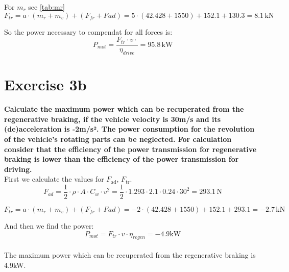 \documentclass[final]{scrreprt} %
\begin{document}
For $m_r$ see \ref{tab:mr}
\begin{equation}
F_{tr} = a\cdot(m_{r} + m_{v}) + (F_{fr} + F{ad}) = 5\cdot(42.428 + 1550) + 152.1 + 130.3 = 8.1\, \mathrm{kN}
\end{equation}

So the power necessary to compendat for all forces is:
\begin{equation}
P_{mot} = \frac{F_{tr} \cdot v \cdot}{ \eta_{drive}} = 95.8 \, \mathrm{kW}
\end{equation}

\section{Exercise 3b}
{\bf Calculate the maximum power which can be recuperated from the regenerative braking, if the vehicle velocity is 30m/s and its (de)acceleration is -2m/s². The power consumption for the revolution of the vehicle's rotating parts can be neglected. For calculation consider that the efficiency of the power transmission for regenerative braking is lower than the efficiency of the power transmission for driving.}\\

First we calculate the values for  $F_{\mathrm{ad}}$, $F_{\mathrm{tr}}$.\\
\begin{equation}
F_{ad} = \frac{1}{2} \cdot \rho \cdot A \cdot C_{w} \cdot v^2 = \frac{1}{2} \cdot 1.293 \cdot 2.1  \cdot 0.24 \cdot 30^2 = 293.1 \, \mathrm{N}
\end{equation}

\begin{equation}
F_{tr} = a\cdot(m_{r} + m_{v}) + (F_{fr} + F{ad}) = -2\cdot(42.428 + 1550) + 152.1 + 293.1 = -2.7 \, \mathrm{kN}
\end{equation}

And then we find the power: 
\begin{equation}
P_{mot} = F_{tr} \cdot v \cdot \eta_{regen} = -4.9 \mathrm{kW}
\end{equation}\\

The maximum power which can be recuperated from the regenerative braking is 4.9kW.
\end{document}
